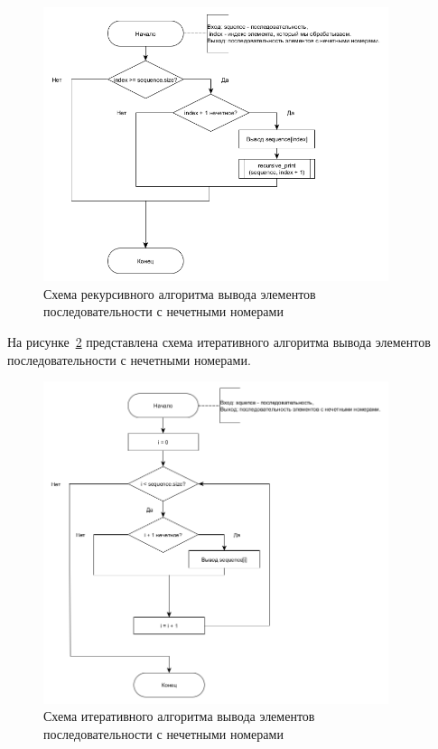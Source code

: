 \begin{figure}[h!]
	\includegraphics[width=0.9\textwidth, height=0.9\textheight, keepaspectratio]{images/recursive_scheme}
	\caption{Схема рекурсивного алгоритма вывода элементов последовательности с нечетными номерами}
	\label{recursive}
\end{figure}
\clearpage

На рисунке~\ref{iteration} представлена схема итеративного алгоритма вывода элементов последовательности с нечетными номерами.

\begin{figure}[h!]
	\includegraphics[width=0.9\textwidth, height=0.9\textheight, keepaspectratio]{images/iteration}
	\caption{Схема итеративного алгоритма вывода элементов последовательности с нечетными номерами}
	\label{iteration}
\end{figure}
\clearpage

